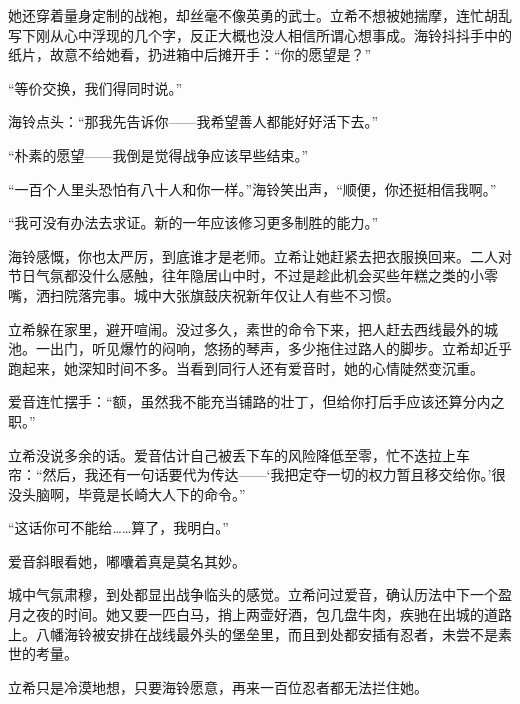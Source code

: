 \documentclass{article}
\begin{document}
她还穿着量身定制的战袍，却丝毫不像英勇的武士。立希不想被她揣摩，连忙胡乱写下刚从心中浮现的几个字，反正大概也没人相信所谓心想事成。海铃抖抖手中的纸片，故意不给她看，扔进箱中后摊开手：“你的愿望是？”



“等价交换，我们得同时说。”



海铃点头：“那我先告诉你——我希望善人都能好好活下去。”



“朴素的愿望——我倒是觉得战争应该早些结束。”



“一百个人里头恐怕有八十人和你一样。”海铃笑出声，“顺便，你还挺相信我啊。”



“我可没有办法去求证。新的一年应该修习更多制胜的能力。”



海铃感慨，你也太严厉，到底谁才是老师。立希让她赶紧去把衣服换回来。二人对节日气氛都没什么感触，往年隐居山中时，不过是趁此机会买些年糕之类的小零嘴，洒扫院落完事。城中大张旗鼓庆祝新年仅让人有些不习惯。



立希躲在家里，避开喧闹。没过多久，素世的命令下来，把人赶去西线最外的城池。一出门，听见爆竹的闷响，悠扬的琴声，多少拖住过路人的脚步。立希却近乎跑起来，她深知时间不多。当看到同行人还有爱音时，她的心情陡然变沉重。



爱音连忙摆手：“额，虽然我不能充当铺路的壮丁，但给你打后手应该还算分内之职。”



立希没说多余的话。爱音估计自己被丢下车的风险降低至零，忙不迭拉上车帘：“然后，我还有一句话要代为传达——‘我把定夺一切的权力暂且移交给你。’很没头脑啊，毕竟是长崎大人下的命令。”



“这话你可不能给……算了，我明白。”



爱音斜眼看她，嘟囔着真是莫名其妙。



城中气氛肃穆，到处都显出战争临头的感觉。立希问过爱音，确认历法中下一个盈月之夜的时间。她又要一匹白马，捎上两壶好酒，包几盘牛肉，疾驰在出城的道路上。八幡海铃被安排在战线最外头的堡垒里，而且到处都安插有忍者，未尝不是素世的考量。



立希只是冷漠地想，只要海铃愿意，再来一百位忍者都无法拦住她。
\end{document}
